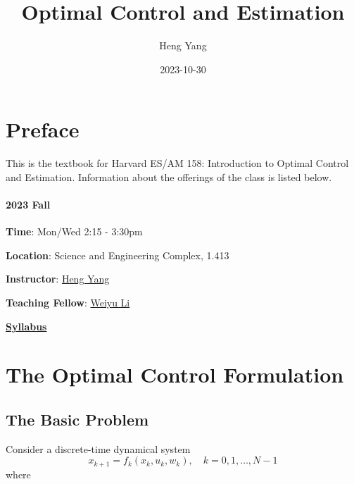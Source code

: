 \documentclass[
]{book}
\title{Optimal Control and Estimation}
\author{Heng Yang}
\date{2023-10-30}
\theoremstyle{definition}
\theoremstyle{definition}
\theoremstyle{definition}
\theoremstyle{definition}
\theoremstyle{remark}
\begin{document}
\maketitle

{
\setcounter{tocdepth}{1}
\tableofcontents
}
\hypertarget{preface}{%
\chapter*{Preface}\label{preface}}

This is the textbook for Harvard ES/AM 158: Introduction to Optimal Control and Estimation. Information about the offerings of the class is listed below.

\hypertarget{fall}{%
\subsubsection*{2023 Fall}\label{fall}}

\textbf{Time}: Mon/Wed 2:15 - 3:30pm

\textbf{Location}: Science and Engineering Complex, 1.413

\textbf{Instructor}: \href{https://hankyang.seas.harvard.edu/}{Heng Yang}

\textbf{Teaching Fellow}: \href{https://scholar.harvard.edu/weiyuli/home}{Weiyu Li}

\href{https://docs.google.com/document/d/1q8_jB5dLx9jHOBi3DQ48Vv2E243ocGCGm_H0mJuOojM/edit?usp=sharing}{\textbf{Syllabus}}

\hypertarget{formulation}{%
\chapter{The Optimal Control Formulation}\label{formulation}}

\hypertarget{the-basic-problem}{%
\section{The Basic Problem}\label{the-basic-problem}}

Consider a discrete-time dynamical system
\begin{equation}
x_{k+1} = f_k (x_k, u_k, w_k), \quad k =0,1,\dots,N-1
\label{eq:discrete-time-dynamics}
\end{equation}
where
\end{document}
